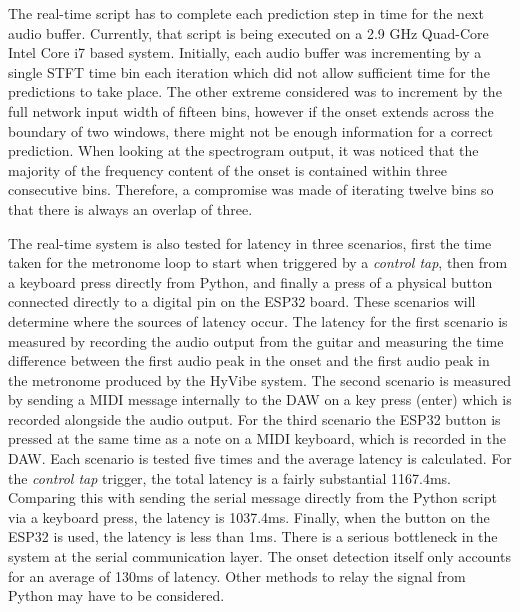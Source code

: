 \documentclass[conference]{IEEEtran}
\begin{document}
The real-time script has to complete each prediction step in time for the next audio buffer. Currently, that script is being executed on a 2.9 GHz Quad-Core Intel Core i7 based system. Initially, each audio buffer was incrementing
by a single STFT time bin each iteration which did not allow sufficient time for the predictions to take place. The other extreme considered was to increment by the full network input width of fifteen bins, however if the onset extends
across the boundary of two windows, there might not be enough information for a correct prediction. When looking at the spectrogram output, it was noticed that the majority of the frequency content of the onset is contained within three 
consecutive bins. Therefore, a compromise was made of iterating twelve bins so that there is always an overlap of three.

The real-time system is also tested for latency in three scenarios, first the time taken for the metronome loop to start when triggered by a \emph{control tap}, then from a keyboard press directly from Python, and finally a press of a physical button connected directly to a digital pin on the ESP32 board. 
These scenarios will determine where the sources of latency occur. The latency for the first scenario is measured by recording the audio output from the guitar and measuring the time difference between the first audio peak in the onset and the first audio peak in the metronome produced by the HyVibe system.
The second scenario is measured by sending a MIDI message internally to the DAW on a key press (enter) which is recorded alongside the audio output. For the third scenario the ESP32 button is pressed at the same time as a note on a MIDI keyboard, which is recorded in the DAW. 
Each scenario is tested five times and the average latency is calculated. For the \emph{control tap} trigger, the total latency is a fairly substantial 1167.4ms. Comparing this with sending
the serial message directly from the Python script via a keyboard press, the latency is 1037.4ms. Finally, when the button on the ESP32 is used, the latency is less than 1ms.
There is a serious bottleneck in the system at the serial communication layer. The onset detection itself only accounts for an average of 130ms of latency. Other methods to relay the signal
from Python may have to be considered.
\end{document}

